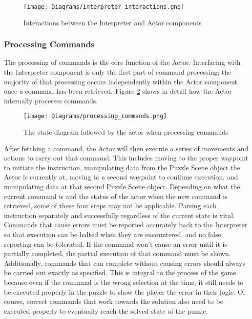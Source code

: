 \begin{figure}[!htb]
  \caption{Interactions between the Interpreter and Actor components}
  \label{fig:interpreter_interactions}
  \centering
  \texttt{[image: Diagrams/interpreter\_interactions.png]}
\end{figure}

\subsubsection{Processing Commands}
The processing of commands is the core function of the Actor. Interfacing with the Interpreter component is only the first part of command processing; the majority of that processing occurs independently within the Actor component once a command has been retrieved. Figure \ref{fig:processing_commands} shows in detail how the Actor internally processes commands.\\

\begin{figure}[!htb]
  \caption{The state diagram followed by the actor when processing commands}
  \label{fig:processing_commands}
  \centering
  \texttt{[image: Diagrams/processing\_commands.png]}
\end{figure}

After fetching a command, the Actor will then execute a series of movements and actions to carry out that command. This includes moving to the proper waypoint to initiate the instruction, manipulating data from the Puzzle Scene object the Actor is currently at, moving to a second waypoint to continue execution, and manipulating data at that second Puzzle Scene object. Depending on what the current command is and the status of the actor when the new command is retrieved, some of these four steps may not be applicable. Parsing each instruction separately and successfully regardless of the current state is vital. Commands that cause errors must be reported accurately back to the Interpreter so that execution can be halted when they are encountered, and no false reporting can be tolerated. If the command won't cause an error until it is partially completed, the partial execution of that command must be shown. Additionally, commands that can complete without causing errors should always be carried out exactly as specified. This is integral to the process of the game because even if the command is the wrong selection at the time, it still needs to be executed properly in the puzzle to show the player the error in their logic. Of course, correct commands that work towards the solution also need to be executed properly to eventually reach the solved state of the puzzle.\\

